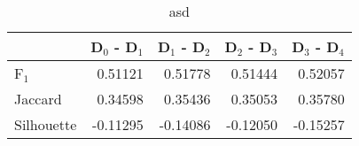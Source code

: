 \begin{table}
\centering
\caption{asd}
\label{tab:s1-cont-splitmerge-combined}
\begin{tabular}{lrrrr}
\toprule
{} &  D$_0$ - D$_1$ &  D$_1$ - D$_2$ &  D$_2$ - D$_3$ &  D$_3$ - D$_4$ \\
\midrule
F$_1$      &        0.51121 &        0.51778 &        0.51444 &        0.52057 \\
Jaccard    &        0.34598 &        0.35436 &        0.35053 &        0.35780 \\
Silhouette &       -0.11295 &       -0.14086 &       -0.12050 &       -0.15257 \\
\bottomrule
\end{tabular}
\end{table}
